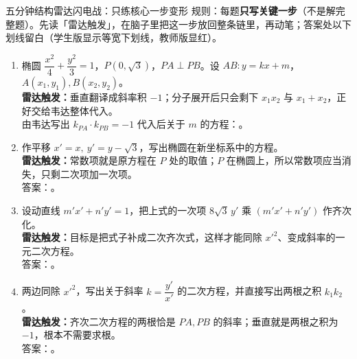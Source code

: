 

\begin{warmupbox}{五分钟结构雷达闪电战：只练核心一步变形}
规则：每题\textbf{只写关键一步}（不是解完整题）。先读「雷达触发」，在脑子里把这一步放回整条链里，再动笔；答案处以下划线留白（学生版显示等宽下划线，教师版显红）。

\begin{enumerate}[label=(\arabic*), itemsep=5pt]
\item 椭圆 $\dfrac{x^2}{4}+\dfrac{y^2}{3}=1$，$P(0,\sqrt3)$，$PA\perp PB$。设 $AB:y=kx+m$，$A(x_1,y_1),B(x_2,y_2)$。\\
{\small\bfseries\textcolor{third}{雷达触发：}}垂直翻译成斜率积 $-1$；分子展开后只会剩下 $x_1x_2$ 与 $x_1+x_2$，正好交给韦达整体代入。\\
由韦达写出 $k_{PA}\cdot k_{PB}=-1$ 代入后关于 $m$ 的方程：。

\item 作平移 $x'=x,\ y'=y-\sqrt3$，写出椭圆在新坐标系中的方程。\\
{\small\bfseries\textcolor{third}{雷达触发：}}常数项就是原方程在 $P$ 处的取值；$P$ 在椭圆上，所以常数项应当消失，只剩二次项加一次项。\\
答案：。

\item 设动直线 $m'x'+n'y'=1$，把上式的一次项 $8\sqrt3\,y'$ 乘 $(m'x'+n'y')$ 作齐次化。\\
{\small\bfseries\textcolor{third}{雷达触发：}}目标是把式子补成二次齐次式，这样才能同除 $x'^2$、变成斜率的一元二次方程。\\
答案：。

\item 两边同除 $x'^2$，写出关于斜率 $k=\dfrac{y'}{x'}$ 的二次方程，并直接写出两根之积 $k_1k_2$。\\
{\small\bfseries\textcolor{third}{雷达触发：}}齐次二次方程的两根恰是 $PA,PB$ 的斜率；垂直就是两根之积为 $-1$，根本不需要求根。\\
答案：。


\end{enumerate}
\end{warmupbox}

